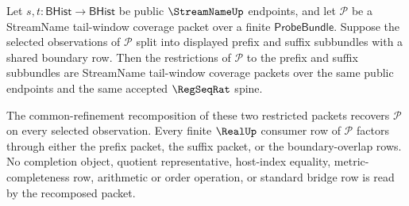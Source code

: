 \begin{theorem}
\label{thm:streamname-tail-window-prefix-suffix-recomposition}
Let $s,t:\mathsf{BHist}\to\mathsf{BHist}$ be public $\StreamNameUp$
endpoints, and let $\mathcal P$ be a StreamName tail-window coverage packet
over a finite $\mathsf{ProbeBundle}$. Suppose the selected observations of
$\mathcal P$ split into displayed prefix and suffix subbundles with a shared
boundary row. Then the restrictions of $\mathcal P$ to the prefix and suffix
subbundles are StreamName tail-window coverage packets over the same public
endpoints and the same accepted $\RegSeqRat$ spine.

The common-refinement recomposition of these two restricted packets recovers
$\mathcal P$ on every selected observation. Every finite $\RealUp$ consumer
row of $\mathcal P$ factors through either the prefix packet, the suffix
packet, or the boundary-overlap rows. No completion object, quotient
representative, host-index equality, metric-completeness row, arithmetic or
order operation, or standard bridge row is read by the recomposed packet.
\end{theorem}
